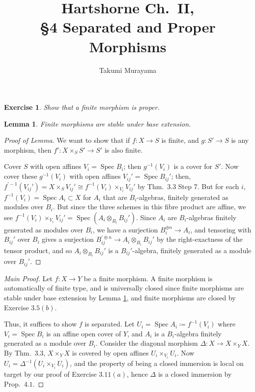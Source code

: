 \documentclass[12pt,letterpaper]{article}
\title{Hartshorne Ch.~II,\\\S4 Separated and Proper Morphisms}
\author{Takumi Murayama}
\newtheorem{problem}{Exercise}[section]
\newtheorem{lemma}{Lemma}%
\theoremstyle{definition}
\theoremstyle{remark}
\numberwithin{equation}{section}
\numberwithin{figure}{problem}
\DeclareMathOperator{\Spec}{Spec}
\begin{document}
\maketitle
\setcounter{section}{4}
\begin{problem}
  Show that a finite morphism is proper.
\end{problem}
\begin{lemma}\label{lem:finitebasechange}
  Finite morphisms are stable under base extension.
\end{lemma}
\begin{proof}[Proof of Lemma]
  We want to show that if $f\colon X \to S$ is finite, and $g\colon S' \to S$ is any morphism, then $f'\colon X \times_S S' \to S'$ is also finite.
  \par Cover $S$ with open affines $V_i = \Spec B_i$; then $g^{-1}(V_i)$ is a
  cover for $S'$. Now cover these $g^{-1}(V_i)$ with open affines $V_{ij}' =
  \Spec B_{ij}'$; then, $f^{\prime-1}(V_{ij}') = X \times_S V_{ij}' \cong f^{-1}(V_i)
  \times_{V_i} V_{ij}'$ by Thm.~3.3 Step 7. But for each $i$, $f^{-1}(V_i) =
  \Spec A_i \subset X$ for $A_{i}$ that are $B_i$-algebras, finitely
  generated as modules over $B_i$. But since the three
  schemes in this fibre product are affine, we see $f^{-1}(V_i) \times_{V_i}
  V_{ij}' = \Spec (A_i \otimes_{B_i} B_{ij}')$. Since $A_i$ are $B_i$-algebras
  finitely generated as modules over $B_i$, we have a surjection $B_i^{\oplus n} \to
  A_{i}$, and tensoring with $B_{ij}'$ over $B_i$ gives a surjection
  $B_{ij}^{\prime\oplus n} \to A_{i} \otimes_{B_i} B_{ij}'$ by the right-exactness of
  the tensor product, and so $A_{i} \otimes_{B_i} B_{ij}'$ is a
  $B_{ij}'$-algebra, finitely generated as a module over $B_{ij}'$.
\end{proof}
\begin{proof}[Main Proof]
  Let $f\colon X \to Y$ be a finite morphism. A finite morphism is automatically
  of finite type, and is universally closed since finite morphisms are stable
  under base extension by Lemma \ref{lem:finitebasechange}, and finite morphisms
  are closed by Exercise $3.5(b)$.
  \par Thus, it suffices to show $f$ is separated. Let $U_i = \Spec A_i \coloneqq
  f^{-1}(V_i)$ where $V_i = \Spec B_i$ is an affine open cover of $Y$, and $A_i$
  is a $B_i$-algebra finitely generated as a module over $B_i$. Consider the diagonal
  morphism $\Delta \colon X \to X \times_Y X$. By Thm.\ 3.3, $X \times_Y X$ is
  covered by open affines $U_i \times_{V_i} U_i$. Now $U_i = \Delta^{-1}(U_i
  \times_{V_i} U_i)$, and the property of being a closed immersion is local on
  target by our proof of Exercise $3.11(a)$, hence $\Delta$ is a closed
  immersion by Prop.\ $4.1$.
\end{proof}
\end{document}
